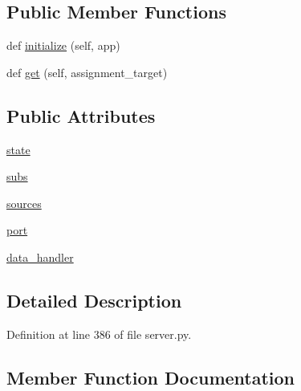 \subsection*{Public Member Functions}
\begin{DoxyCompactItemize}
\item 
def \hyperlink{classparlai_1_1mturk_1_1webapp_1_1server_1_1AssignmentHandler_a4d6fc0f6605557f5ede04d06db680640}{initialize} (self, app)
\item 
def \hyperlink{classparlai_1_1mturk_1_1webapp_1_1server_1_1AssignmentHandler_aefae6e70faeaf069860b5d63079b68a1}{get} (self, assignment\+\_\+target)
\end{DoxyCompactItemize}
\subsection*{Public Attributes}
\begin{DoxyCompactItemize}
\item 
\hyperlink{classparlai_1_1mturk_1_1webapp_1_1server_1_1AssignmentHandler_a91eb25d50a115871504574869c53ee15}{state}
\item 
\hyperlink{classparlai_1_1mturk_1_1webapp_1_1server_1_1AssignmentHandler_a1c7b99d261745891f7f408a8ee575384}{subs}
\item 
\hyperlink{classparlai_1_1mturk_1_1webapp_1_1server_1_1AssignmentHandler_a2a9d201d89e660f9337dce5b79f7969c}{sources}
\item 
\hyperlink{classparlai_1_1mturk_1_1webapp_1_1server_1_1AssignmentHandler_adfbd99a455bf117e46d06af4b54f4995}{port}
\item 
\hyperlink{classparlai_1_1mturk_1_1webapp_1_1server_1_1AssignmentHandler_a4c052c9d3481b6c237b86cc00238b46e}{data\+\_\+handler}
\end{DoxyCompactItemize}


\subsection{Detailed Description}


Definition at line 386 of file server.\+py.



\subsection{Member Function Documentation}
\mbox{\label{classparlai_1_1mturk_1_1webapp_1_1server_1_1AssignmentHandler_aefae6e70faeaf069860b5d63079b68a1}} 
